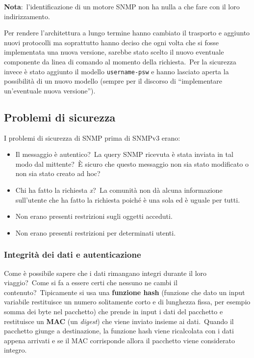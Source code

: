 \noindent\textbf{Nota}:\ l'identificazione di un motore SNMP non ha nulla a che fare con il loro indirizzamento.

Per rendere l'architettura a lungo termine hanno cambiato il trasporto e aggiunto nuovi protocolli ma soprattutto hanno deciso che ogni volta che si fosse implementata una nuova versione, sarebbe stato scelto il nuovo eventuale componente da linea di comando al momento della richiesta.\
Per la sicurezza invece è stato aggiunto il modello \verb|username-psw| e hanno lasciato aperta la possibilità di un nuovo modello (sempre per il discorso di ``implementare un'eventuale nuova versione'').

\subsection{Problemi di sicurezza}

I problemi di sicurezza di SNMP prima di SNMPv3 erano:
\begin{itemize}
    \item Il messaggio è autentico?\ La query SNMP ricevuta è stata inviata in tal modo dal mittente?\ È sicuro che questo messaggio non sia stato modificato o non sia stato creato ad hoc?
    \item Chi ha fatto la richiesta \textit{x}?\ La comunità non dà alcuna informazione sull'utente che ha fatto la richiesta poiché è una sola ed è uguale per tutti.
    \item Non erano presenti restrizioni sugli oggetti acceduti.
    \item Non erano presenti restrizioni per determinati utenti.
\end{itemize}

\subsubsection{Integrità dei dati e autenticazione}

Come è possibile sapere che i dati rimangano integri durante il loro viaggio?\ Come si fa a essere certi che nessuno ne cambi il contenuto?\
Tipicamente si usa una \textbf{funzione hash} (funzione che dato un input variabile restituisce un numero solitamente corto e di lunghezza fissa, per esempio somma dei byte nel pacchetto) che prende in input i dati del pacchetto e restituisce un \textbf{MAC} (un \textit{digest}) che viene inviato insieme ai dati.\
Quando il pacchetto giunge a destinazione, la funzione hash viene ricalcolata con i dati appena arrivati e se il MAC corrisponde allora il pacchetto viene considerato integro.\

